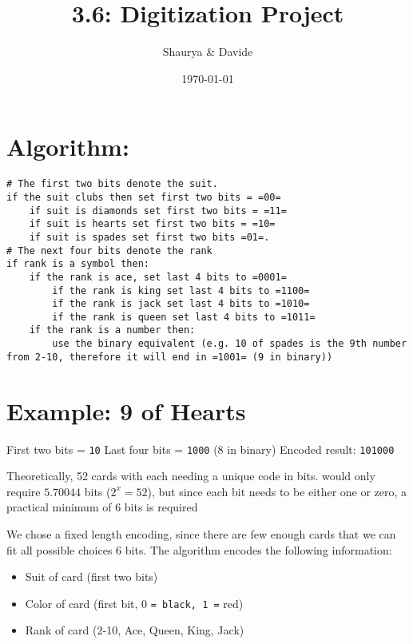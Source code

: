 \documentclass{scrartcl}
\author{Shaurya \& Davide}
\date{\today}
\title{3.6: Digitization Project}
\begin{document}
\makeatletter
\newcommand{\citeprocitem}[2]{\hyper@linkstart{cite}{citeproc_bib_item_#1}#2\hyper@linkend}
\makeatother



\maketitle
\tableofcontents


\section{Algorithm:}
\label{sec:org83837e4}
\begin{Code}[alt]
\begin{verbatim}
# The first two bits denote the suit.
if the suit clubs then set first two bits = =00=
    if suit is diamonds set first two bits = =11=
    if suit is hearts set first two bits = =10=
    if suit is spades set first two bits =01=.
# The next four bits denote the rank
if rank is a symbol then:
    if the rank is ace, set last 4 bits to =0001=
        if the rank is king set last 4 bits to =1100=
        if the rank is jack set last 4 bits to =1010=
        if the rank is queen set last 4 bits to =1011=
    if the rank is a number then:
        use the binary equivalent (e.g. 10 of spades is the 9th number from 2-10, therefore it will end in =1001= (9 in binary))
\end{verbatim}
\end{Code}

\section{Example: 9 of Hearts}
\label{sec:org7fd7258}
First two bits = \texttt{10}
Last four bits = \texttt{1000} (8 in binary)
Encoded result: \texttt{101000}

Theoretically, 52 cards with each needing a unique code in bits. would only require \(5.70044\) bits (\(2^x = 52\)), but since each bit needs to be either one or zero, a practical minimum of 6 bits is required

We chose a fixed length encoding, since there are few enough cards that we can fit all possible choices 6 bits. The algorithm encodes the following information:
\begin{itemize}
\item Suit of card (first two bits)
\item Color of card (first bit, 0 \texttt{= black, 1 =} red)
\item Rank of card (2-10, Ace, Queen, King, Jack)
\end{itemize}
\end{document}
